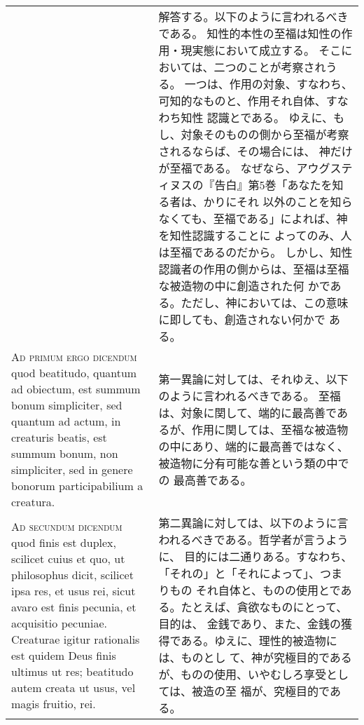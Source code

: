\documentclass[10pt]{jsarticle} %
\begin{document}
\begin{longtable}{p{21em}p{21em}}
&

解答する。以下のように言われるべきである。
知性的本性の至福は知性の作用・現実態において成立する。
そこにおいては、二つのことが考察されうる。
一つは、作用の対象、すなわち、可知的なものと、作用それ自体、すなわち知性
 認識とである。
ゆえに、もし、対象そのものの側から至福が考察されるならば、その場合には、
 神だけが至福である。
なぜなら、アウグスティヌスの『告白』第5巻「あなたを知る者は、かりにそれ
 以外のことを知らなくても、至福である」によれば、神を知性認識することに
 よってのみ、人は至福であるのだから。
しかし、知性認識者の作用の側からは、至福は至福な被造物の中に創造された何
 かである。ただし、神においては、この意味に即しても、創造されない何かで
 ある。


\\



{\scshape Ad primum ergo dicendum} quod beatitudo, quantum ad obiectum, est summum
bonum simpliciter, sed quantum ad actum, in creaturis beatis, est summum
bonum, non simpliciter, sed in genere bonorum participabilium a
creatura.


&

第一異論に対しては、それゆえ、以下のように言われるべきである。
至福は、対象に関して、端的に最高善であるが、作用に関しては、至福な被造物
 の中にあり、端的に最高善ではなく、被造物に分有可能な善という類の中での
 最高善である。

\\



{\scshape Ad secundum dicendum} quod finis est duplex, scilicet cuius et quo, ut
philosophus dicit, scilicet ipsa res, et usus rei, sicut avaro est finis
pecunia, et acquisitio pecuniae. Creaturae igitur rationalis est quidem
Deus finis ultimus ut res; beatitudo autem creata ut usus, vel magis
fruitio, rei.


&

第二異論に対しては、以下のように言われるべきである。哲学者が言うように、
 目的には二通りある。すなわち、「それの」と「それによって」、つまりもの
 それ自体と、ものの使用とである。たとえば、貪欲なものにとって、目的は、
 金銭であり、また、金銭の獲得である。ゆえに、理性的被造物には、ものとし
 て、神が究極目的であるが、ものの使用、いやむしろ享受としては、被造の至
 福が、究極目的である。



\end{longtable}

\newpage
\end{document}
